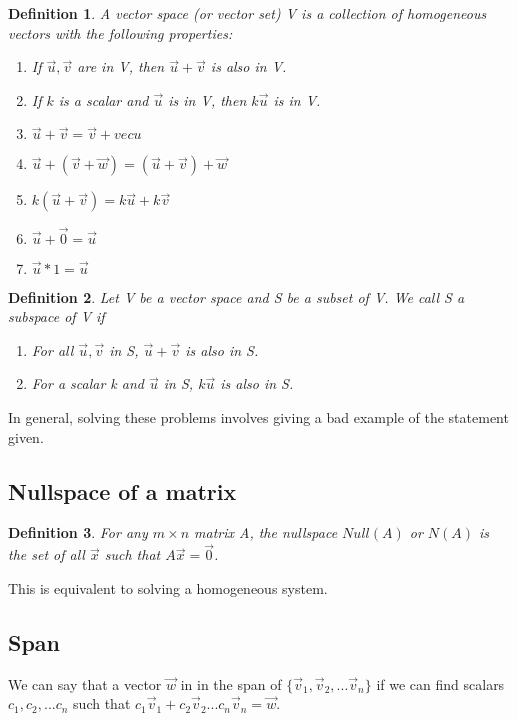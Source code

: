 \documentclass{article}
\newtheorem{definition}{Definition}
\begin{document}
\begin{definition}
	A vector space (or vector set) V is a collection of homogeneous vectors
	with the following properties: 
	\begin{enumerate}
		\item If $\vec{u},\vec{v}$ are in V, then $\vec{u}+\vec{v}$ is
			also in V.
		\item If $k$ is a scalar and $\vec{u}$ is in V, then $k\vec{u}$
			is in V.
		\item $\vec{u}+\vec{v}=\vec{v}+vec{u}$
		\item $\vec{u}+(\vec{v}+\vec{w})=(\vec{u}+\vec{v})+\vec{w}$
		\item $k(\vec{u}+\vec{v})=k\vec{u}+k\vec{v}$
		\item $\vec{u}+\vec{0}=\vec{u}$
		\item $\vec{u}*1=\vec{u}$
	\end{enumerate}
\end{definition}

\begin{definition}
	Let V be  a vector space and S be a subset of V. We call S a subspace
	of V if 
	\begin{enumerate}
		\item For all $\vec{u}, \vec{v}$ in S, $\vec{u}+\vec{v}$ is 
			also in S.
		\item For a scalar k and $\vec{u}$ in S, $k\vec{u}$ is also
			in S.
	\end{enumerate}
\end{definition}

In general, solving these problems involves giving a bad example of the 
statement given.

\subsection{Nullspace of a matrix}
\begin{definition}
	For any $m\times n$ matrix A, the nullspace $Null(A)$ or $N(A)$ is the
	set of all $\vec{x}$ such that $A\vec{x}=\vec{0}$.
\end{definition}

This is equivalent to solving a homogeneous system.

\subsection{Span}

We can say that a vector $\vec{w}$ in in the span of $\{\vec{v}_1, \vec{v}_2, ... \vec{v}_n\}$ if we can find scalars $c_1,c_2,...c_n$
such that $c_1\vec{v}_1+c_2\vec{v}_2...c_n\vec{v}_n=\vec{w}$.
\end{document}
